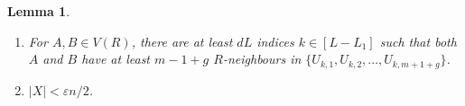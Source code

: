 \documentclass[reqno, 12pt]{amsart}
\numberwithin{equation}{section}
\numberwithin{figure}{section}
\theoremstyle{plain}
\newtheorem{lemma}[thm]{Lemma}
\theoremstyle{definition}
\let\eps=\varepsilon
\begin{document}
\begin{lemma}
\begin{enumerate}
            \noindent
            For each $k \in [L-L_1]$,
			$$|U_{k,1}|= |U_{k,2} |= \ldots = |U_{k,m+1+g}|,$$
            $$|U_{k,1}\cup U_{k,2}\cup\dots\cup U_{k,m+1+g}|= \frac{n}{L}(1 \pm \eps ),$$
            and $(U_{k,1},\dots, U_{k,m+1+g})$ is a $(\eps,d^+,d)$-super-regular tuple.
			
            \item\label{l:part-w-r-f_(iii)} For $A, B \in V(R)$, there are at least $d L$ indices $k \in [L-L_1]$ such that both $A$ and $B$ have at least $m-1+g$ $R$-neighbours in $\{U_{k,1},U_{k,2},\ldots, U_{k,m+1+g} \}$.
			
            \item\label{l:part-w-r-f_(iv)} $|X|< \eps n/2$.
            
	\end{enumerate}
    \end{lemma}
    
\end{document}
